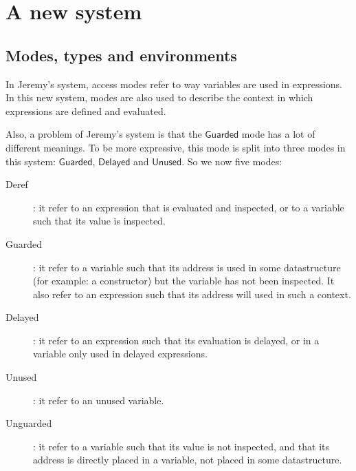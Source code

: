 \documentclass{article}
\newcommand{\Guarded}{\mathsf{Guarded}}
\newcommand{\Delayed}{\mathsf{Delayed}}
\newcommand{\Unused}{\mathsf{Unused}}
\begin{document}
\section{A new system}


\subsection{Modes, types and environments}
In Jeremy's system, access modes refer to way variables are used in expressions.
In this new system, modes are also used to describe the context in which
expressions are defined and evaluated.

Also, a problem of Jeremy's system is that the $\Guarded$ mode has a lot of
different meanings. To be more expressive, this mode is split into three modes
in this system: $\Guarded$, $\Delayed$ and $\Unused$. So we now five modes:

\begin{description}
  \item[Deref]: it refer to an expression that is evaluated and inspected, or to
    a variable such that its value is inspected.
  \item[Guarded]: it refer to a variable such that its address is used in some
    datastructure (for example: a constructor) but the variable has not been
    inspected. It also refer to an expression such that its address will used
    in such a context.
  \item[Delayed]: it refer to an expression such that its evaluation is delayed,
    or in a variable only used in delayed expressions.
  \item[Unused]: it refer to an unused variable.
  \item[Unguarded]: it refer to a variable such that its value is not inspected,
    and that its address is directly placed in a variable, not placed in some
    datastructure.
\end{description}
\end{document}
